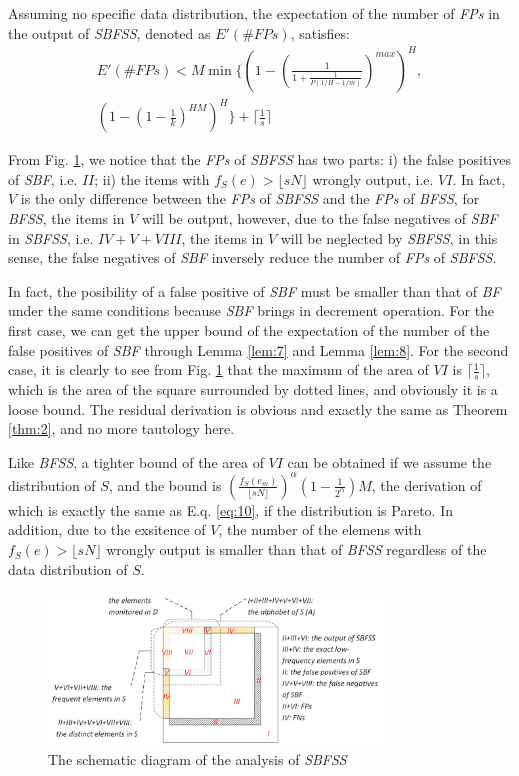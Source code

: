\documentclass[conference]{IEEEtran}
\begin{document}
\begin{theorem}\label{thm:6}
Assuming no specific data distribution, the expectation of the number of \emph{FPs} in the output of \emph{SBFSS}, denoted as $E'(\#FPs)$, satisfies:
\begin{eqnarray}\label{eq:17}
E'(\#FPs)<M \min \{(1-(\frac{1}{1+\frac{1}{P(1/H-1/m)}})^{max})^H,\\\nonumber
	(1-(1-\frac{1}{k})^{HM})^H\} + \lceil\frac{1}{s}\rceil
\end{eqnarray}
\end{theorem}

\begin{IEEEproof}
From Fig. \ref{fig:sbfss}, we notice that the \emph{FPs} of \emph{SBFSS} has two parts: i) the false positives of \emph{SBF}, i.e. $II$; ii) the items with $f_S(e)>\lfloor sN\rfloor$ wrongly output, i.e. $VI$. In fact, $V$ is the only difference between the \emph{FPs} of \emph{SBFSS} and the \emph{FPs} of \emph{BFSS}, for \emph{BFSS}, the items in $V$ will be output, however, due to the false negatives of \emph{SBF} in \emph{SBFSS}, i.e. $IV+V+VIII$, the items in $V$ will be neglected by \emph{SBFSS}, in this sense, the false negatives of \emph{SBF} inversely reduce the number of \emph{FPs} of \emph{SBFSS}. \par
In fact, the posibility of a false positive of \emph{SBF} must be smaller than that of \emph{BF} under the same conditions because \emph{SBF} brings in decrement operation. For the first case, we can get the upper bound of the expectation of the number of the false positives of \emph{SBF} through Lemma \ref{lem:7} and Lemma \ref{lem:8}. For the second case, it is clearly to see from Fig. \ref{fig:sbfss} that the maximum of the area of $VI$ is $\lceil\frac{1}{s}\rceil$, which is the area of the square surrounded by dotted lines, and obviously it is a loose bound. The residual derivation is obvious and exactly the same as Theorem \ref{thm:2}, and no more tautology here.
\end{IEEEproof}
Like \emph{BFSS}, a tighter bound of the area of $VI$ can be obtained if we assume the distribution of $S$, and the bound is $(\frac{f_S(e_m)}{\lfloor sN\rfloor})^\alpha(1-\frac{1}{2^\alpha})M$, the derivation of which is exactly the same as E.q. \ref{eq:10}, if the distribution is Pareto. In addition, due to the exsitence of $V$, the number of the elemens with $f_S(e)>\lfloor sN\rfloor$ wrongly output is smaller than that of \emph{BFSS} regardless of the data distribution of $S$. 
\begin{figure}
	\centering
	\includegraphics[width=3.5in]{png/sbfss.png}
	\caption{The schematic diagram of the analysis of \emph{SBFSS}}
	\label{fig:sbfss}
\end{figure}
\end{document}
